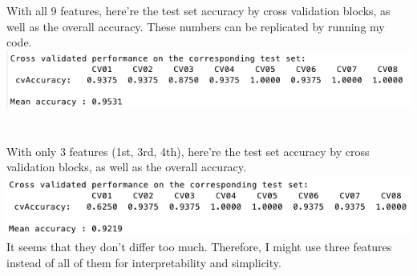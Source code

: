 \documentclass[paper=a4, fontsize=11pt]{scrartcl} %
\numberwithin{equation}{section} %
\numberwithin{figure}{section} %
\numberwithin{table}{section} %
\begin{document}
With all 9 features, here're the test set accuracy by cross validation blocks, as well as the overall accuracy. These numbers can be replicated by running my code. \\
\includegraphics[scale=.6]{featuresAll}\\\\\\
With only 3 features (1st, 3rd, 4th), here're the test set accuracy by cross validation blocks, as well as the overall accuracy.\\
\includegraphics[scale=.6]{featuresThree}\\


It seems that they don't differ too much. Therefore, I might use three features instead of all of them for interpretability and simplicity. 
\end{document}
